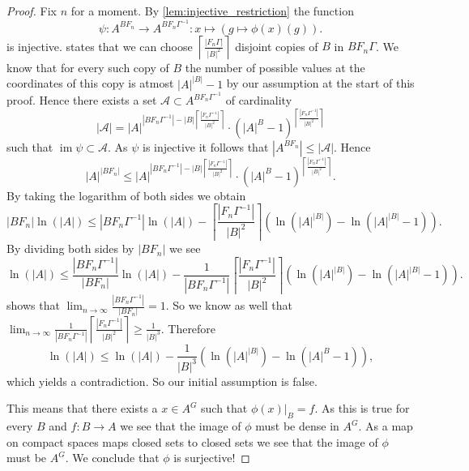 \documentclass[titlepage, a4paper]{article}
\newcommand{\card}[1]{\left| #1 \right|}
\DeclareMathOperator{\im}{im}
\theoremstyle{remark}
\begin{document}
\begin{proof}
	Fix  $n$ for a moment. By \cref{lem:injective_restriction} the function \[
		\psi: A^{BF_n} \to A^{BF_n\Gamma^{-1}}: x \mapsto (g \mapsto \phi(x)(g))
	.\] 
	is injective.
	 states that we can choose  $ \left\lceil \frac{\card{F_n\Gamma}}{\card{B}^2} \right\rceil $ disjoint copies of $B$ in $BF_n\Gamma$. 
	We know that for every such copy of $B$ the number of possible values at the coordinates of this copy is atmost  $\card{A}^{\card{B}} -1$ by our assumption at the start of this proof.
	Hence there exists a set $\mathcal{A} \subset A^{BF_n\Gamma^{-1}}$ of cardinality \[
		\card{\mathcal{A}} = \card{A}^{\card{BF_n\Gamma^{-1}}- \card{B}\left\lceil \frac{\card{F_n\Gamma^{-1}}}{\card{B}^2} \right\rceil } \cdot (\card{A}^{B} -1)^{\left\lceil \frac{\card{F_n\Gamma^{-1}}}{\card{B}^2} \right\rceil }
\]
such that $\im\psi \subset \mathcal{A}$. 
As $\psi$ is injective it follows that $\card{A^{BF_n}} \le \card{\mathcal{A}}$. Hence
\[
	\card{A}^{\card{BF_n}} \le 
	\card{A}^{\card{BF_n\Gamma^{-1}}- \card{B}\left\lceil \frac{\card{F_n\Gamma^{-1}}}{\card{B}^2} \right\rceil } \cdot (\card{A}^{B} -1)^{\left\lceil \frac{\card{F_n\Gamma^{-1}}}{\card{B}^2} \right\rceil }
.\]
By taking the logarithm of both sides we obtain
\[
	\card{BF_n}\ln(\card{A}) \le \card{BF_n\Gamma^{-1}} \ln(\card{A}) - \left\lceil \frac{\card{F_n\Gamma^{-1}}}{\card{B}^2} \right\rceil \left( \ln(\card{A}^{\card{B}}) - \ln(\card{A}^{\card{B}} -1) \right)   
.\]
By dividing both sides by $\card{BF_n}$ we see 
\[
	\ln(\card{A}) \le \frac{\card{BF_n\Gamma^{-1}}}{\card{BF_n}} \ln(\card{A}) - \frac{1}{\card{BF_n\Gamma^{-1}}}\left\lceil \frac{\card{F_n\Gamma^{-1}}}{\card{B}^2} \right\rceil \left( \ln(\card{A}^{\card{B}}) - \ln(\card{A}^{\card{B}} -1) \right)   
.\]
 shows that $\lim_{n \to \infty} \frac{\card{BF_n\Gamma^{-1}}}{\card{BF_n}} = 1$. 
So we know as well that $\lim_{n \to \infty} \frac{1}{\card{BF_n\Gamma^{-1}}} \left\lceil \frac{\card{F_n\Gamma^{-1}}}{\card{B}^2} \right\rceil \ge \frac{1}{\card{B}^3} $. 
Therefore \[
	\ln(\card{A}) \le \ln(\card{A}) - \frac{1}{\card{B}^3} \left(\ln(\card{A}^{\card{B}}) - \ln(\card{A}^{B} - 1) \right)
,\]
which yields a contradiction. 
So our initial assumption is false. 

\bigskip

This means that there exists a $x \in A^{G}$ such that $\phi(x)|_B = f$. As this is true for every  $B$ and $f:B\to A$ we see that the image of  $\phi$ must be dense in $A^{G}$. As a map on compact spaces maps closed sets to closed sets we see that the image of $\phi$ must be $A^{G}$. 
We conclude that $\phi$ is surjective!

\end{proof}
\end{document}
